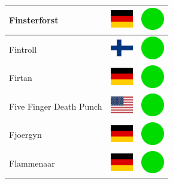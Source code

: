 \documentclass[12pt, a4paper, twoside]{report}
\begin{document}
\begin{center}
\begin{longtable}{|p{5cm}|p{2cm}|p{2cm}|}
 Finsterforst                                               & \includegraphics[width=1cm]{../4x3/de} &   \includegraphics[width=1cm]{../likes/y} \\ \hline
 Fintroll                                                   & \includegraphics[width=1cm]{../4x3/fi} &   \includegraphics[width=1cm]{../likes/y} \\ \hline
 Firtan                                                     & \includegraphics[width=1cm]{../4x3/de} &   \includegraphics[width=1cm]{../likes/y} \\ \hline
 Five Finger Death Punch                                    & \includegraphics[width=1cm]{../4x3/us} &   \includegraphics[width=1cm]{../likes/y} \\ \hline
 Fjoergyn                                                   & \includegraphics[width=1cm]{../4x3/de} &   \includegraphics[width=1cm]{../likes/y} \\ \hline
 Flammenaar                                                 & \includegraphics[width=1cm]{../4x3/de} &   \includegraphics[width=1cm]{../likes/y} \\ \hline

\end{longtable}
\end{center}
\end{document}
